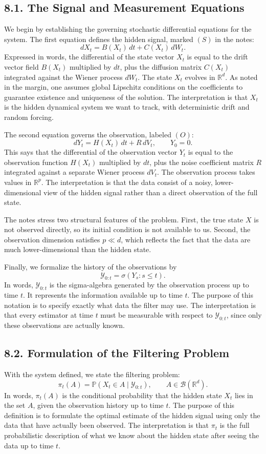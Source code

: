 \documentclass[11pt]{article}
\theoremstyle{definition}
\theoremstyle{remark}
\begin{document}
\subsection*{8.1. The Signal and Measurement Equations}
We begin by establishing the governing stochastic differential equations for the system. The first equation defines the hidden signal, marked $(S)$ in the notes:
\[
dX_t = B(X_t)\,dt + C(X_t)\,dW_t.
\]
Expressed in words, the differential of the state vector $X_t$ is equal to the drift vector field $B(X_t)$ multiplied by $dt$, plus the diffusion matrix $C(X_t)$ integrated against the Wiener process $dW_t$. The state $X_t$ evolves in $\mathbb R^d$. As noted in the margin, one assumes global Lipschitz conditions on the coefficients to guarantee existence and uniqueness of the solution.
The interpretation is that $X_t$ is the hidden dynamical system we want to track, with deterministic drift and random forcing.

The second equation governs the observation, labeled $(O)$:
\[
dY_t = H(X_t)\,dt + R\,dV_t,
\qquad
Y_0=0.
\]
This says that the differential of the observation vector $Y_t$ is equal to the observation function $H(X_t)$ multiplied by $dt$, plus the noise coefficient matrix $R$ integrated against a separate Wiener process $dV_t$. The observation process takes values in $\mathbb R^p$.
The interpretation is that the data consist of a noisy, lower-dimensional view of the hidden signal rather than a direct observation of the full state.

The notes stress two structural features of the problem. First, the true state $X$ is not observed directly, so its initial condition is not available to us. Second, the observation dimension satisfies $p\ll d$, which reflects the fact that the data are much lower-dimensional than the hidden state.

Finally, we formalize the history of the observations by
\[
\mathcal Y_{0:t}=\sigma(Y_s:s\le t).
\]
In words, $\mathcal Y_{0:t}$ is the sigma-algebra generated by the observation process up to time $t$. It represents the information available up to time $t$. The purpose of this notation is to specify exactly what data the filter may use.
The interpretation is that every estimator at time $t$ must be measurable with respect to $\mathcal Y_{0:t}$, since only these observations are actually known.

\subsection*{8.2. Formulation of the Filtering Problem}
With the system defined, we state the filtering problem:
\[
\pi_t(A)=\mathbb P(X_t\in A\mid \mathcal Y_{0:t}),
\qquad
A\in\mathcal B(\mathbb R^d).
\]
In words, $\pi_t(A)$ is the conditional probability that the hidden state $X_t$ lies in the set $A$, given the observation history up to time $t$. The purpose of this definition is to formulate the optimal estimate of the hidden signal using only the data that have actually been observed.
The interpretation is that $\pi_t$ is the full probabilistic description of what we know about the hidden state after seeing the data up to time $t$.
\end{document}
